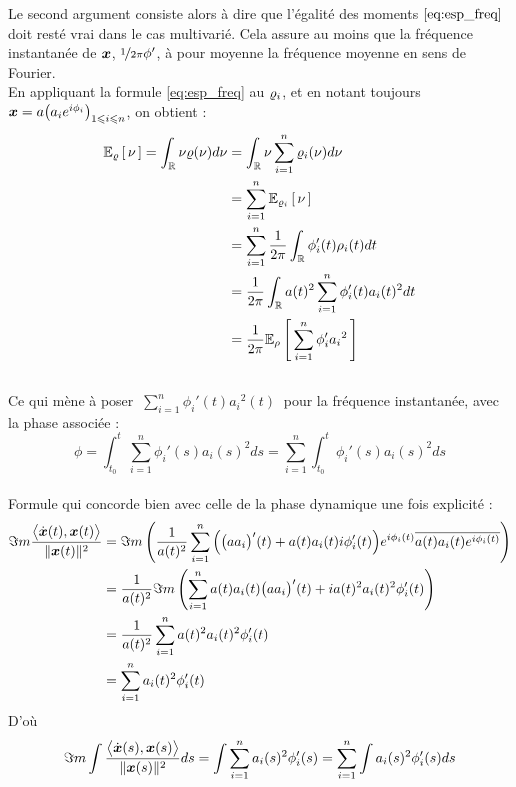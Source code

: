 Le second argument consiste alors à dire que l'égalité des moments $\eqref{eq:esp_freq}$ doit resté vrai dans le cas multivarié. Cela assure au moins que la fréquence instantanée de $\x$, $\nicefrac{1}{2\pi}\phi'$, à pour moyenne la fréquence moyenne en sens de Fourier.
\\

En appliquant la formule \eqref{eq:esp_freq} au $\densis_i$, et en notant toujours $\x = a\big(a_ie^{i\phi_i}\big)_{1\leq i\leq n}$, on obtient :
\begin{align*}
	\esp[\densis]{\nu} = \int_\R \nu\densis(\nu)d\nu &= \int_\R \nu\sum_{i=1}^n \densis_i(\nu) d\nu \\
	&= \sum_{i=1}^n\esp[\densis_i]{\nu} \\
	&= \sum_{i=1}^n\frac{1}{2\pi}\int_\R \phi_i'(t)\densit_i(t)dt \\
	&= \frac{1}{2\pi}\int_\R a(t)^2\sum_{i=1}^n\phi_i'(t)a_i(t)^2 dt 
	\\ &= \frac{1}{2\pi} \esp[\densit]{\sum_{i=1}^n \phi_i'{a_i}^2}
\end{align*}
\\
Ce qui mène à poser $\displaystyle \ \sum_{i=1}^n \phi_i'(t){a_i}^2(t)\ $ pour la fréquence instantanée, avec la phase associée :
\begin{equation}\label{eq:phas_inst_v1}
	\phi = \int_{t_0}^t \sum_{i=1}^n \phi_i'(s){a_i}(s)^2ds 
	= \sum_{i=1}^n \int_{t_0}^t \phi_i'(s){a_i}(s)^2ds 
\end{equation}
\\

Formule qui concorde bien avec celle de la phase dynamique une fois explicité :
\begin{align*}
	\Im m\frac{\big\langle \dot{\x}(t) , \x(t) \big\rangle}{\|\x(t)\|^2} &= \Im m\left( \frac{1}{a(t)^2} \sum_{i=1}^n \Big( \big(aa_i\big)'(t) +a(t)a_i(t)i\phi_i'(t)\Big)e^{i\phi_i(t)}\congu{a(t)a_i(t)e^{i\phi_i(t)}} \right) \\
	&=\frac{1}{a(t)^2}  \Im m\left( \sum_{i=1}^n a(t)a_i(t)\big(aa_i\big)'(t) +ia(t)^2a_i(t)^2\phi_i'(t) \right) \\
	&= \frac{1}{a(t)^2} \sum_{i=1}^n a(t)^2a_i(t)^2 \phi_i'(t) \\
	&= \sum_{i=1}^n a_i(t)^2 \phi_i'(t)
\end{align*}
D'où
\[\Im m\int \frac{\big\langle \dot{\x}(s) , \x(s) \big\rangle}{\|\x(s)\|^2} ds = \int \sum_{i=1}^n a_i(s)^2 \phi_i'(s) = \sum_{i=1}^n \int a_i(s)^2 \phi_i'(s)ds\]
\\



